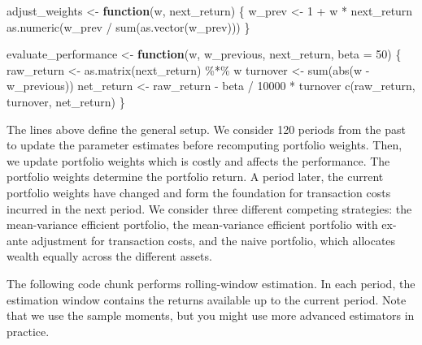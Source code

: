 \documentclass[
]{krantz}
\newenvironment{Shaded}{\begin{snugshade}}{\end{snugshade}}
\newcommand{\AttributeTok}[1]{\textcolor[rgb]{0.61,0.61,0.61}{#1}}
\newcommand{\ControlFlowTok}[1]{\textcolor[rgb]{0.27,0.27,0.27}{\textbf{#1}}}
\newcommand{\DecValTok}[1]{\textcolor[rgb]{0.06,0.06,0.06}{#1}}
\newcommand{\FunctionTok}[1]{\textcolor[rgb]{0,0,0}{#1}}
\newcommand{\NormalTok}[1]{#1}
\newcommand{\OtherTok}[1]{\textcolor[rgb]{0.37,0.37,0.37}{#1}}
\newcommand{\SpecialCharTok}[1]{\textcolor[rgb]{0,0,0}{#1}}
\begin{document}
\begin{Shaded}
\begin{Highlighting}[]
\NormalTok{adjust\_weights }\OtherTok{\textless{}{-}} \ControlFlowTok{function}\NormalTok{(w, next\_return) \{}
\NormalTok{  w\_prev }\OtherTok{\textless{}{-}} \DecValTok{1} \SpecialCharTok{+}\NormalTok{ w }\SpecialCharTok{*}\NormalTok{ next\_return}
  \FunctionTok{as.numeric}\NormalTok{(w\_prev }\SpecialCharTok{/} \FunctionTok{sum}\NormalTok{(}\FunctionTok{as.vector}\NormalTok{(w\_prev)))}
\NormalTok{\}}

\NormalTok{evaluate\_performance }\OtherTok{\textless{}{-}} \ControlFlowTok{function}\NormalTok{(w, w\_previous, next\_return, }\AttributeTok{beta =} \DecValTok{50}\NormalTok{) \{}
\NormalTok{  raw\_return }\OtherTok{\textless{}{-}} \FunctionTok{as.matrix}\NormalTok{(next\_return) }\SpecialCharTok{\%*\%}\NormalTok{ w}
\NormalTok{  turnover }\OtherTok{\textless{}{-}} \FunctionTok{sum}\NormalTok{(}\FunctionTok{abs}\NormalTok{(w }\SpecialCharTok{{-}}\NormalTok{ w\_previous))}
\NormalTok{  net\_return }\OtherTok{\textless{}{-}}\NormalTok{ raw\_return }\SpecialCharTok{{-}}\NormalTok{ beta }\SpecialCharTok{/} \DecValTok{10000} \SpecialCharTok{*}\NormalTok{ turnover}
  \FunctionTok{c}\NormalTok{(raw\_return, turnover, net\_return)}
\NormalTok{\}}
\end{Highlighting}
\end{Shaded}

The lines above define the general setup. We consider 120 periods from the past to update the parameter estimates before recomputing portfolio weights. Then, we update portfolio weights which is costly and affects the performance. The portfolio weights determine the portfolio return. A period later, the current portfolio weights have changed and form the foundation for transaction costs incurred in the next period. We consider three different competing strategies: the mean-variance efficient portfolio, the mean-variance efficient portfolio with ex-ante adjustment for transaction costs, and the naive portfolio, which allocates wealth equally across the different assets.

The following code chunk performs rolling-window estimation. In each period, the estimation window contains the returns available up to the current period. Note that we use the sample moments, but you might use more advanced estimators in practice.
\end{document}
